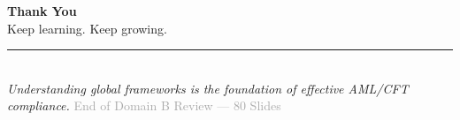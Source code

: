 \documentclass[12pt,aspectratio=169]{beamer}
\begin{document}
	\begin{frame}
		\centering
		\vspace{2.5cm}
		{\fontsize{16}{19}\selectfont \textbf{Thank You}} \\[0.2cm]
		{\fontsize{11}{13}\selectfont Keep learning. Keep growing.} \\[0.15cm]
		\rule{3cm}{0.5pt} \\[0.15cm]
		{\fontsize{8}{10}\selectfont \textit{Understanding global frameworks is the foundation of effective AML/CFT compliance.}}
		\vspace{0.3cm}
		{\fontsize{7}{9}\selectfont \textcolor{darkgray}{End of Domain B Review — 80 Slides}}
	\end{frame}
	
\end{document}
